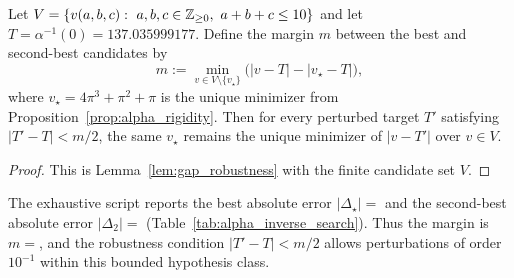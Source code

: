 \begin{corollary}
\label{cor:alpha_gap_robustness}
Let $V=\{v(a,b,c):\ a,b,c\in\mathbb{Z}_{\ge 0},\ a+b+c\le 10\}$ and let $T=\alpha^{-1}(0)=137.035999177$.
Define the margin $m$ between the best and second-best candidates by
\[
m := \min_{v\in V\setminus\{v_\star\}} \big(|v-T|-|v_\star-T|\big),
\]
where $v_\star=4\pi^3+\pi^2+\pi$ is the unique minimizer from Proposition~\ref{prop:alpha_rigidity}.
Then for every perturbed target $T'$ satisfying $|T'-T|<m/2$, the same $v_\star$ remains the unique minimizer of $|v-T'|$ over $v\in V$.
\end{corollary}

\begin{proof}
This is Lemma~\ref{lem:gap_robustness} with the finite candidate set $V$.
\end{proof}

\begin{remark}
The exhaustive script reports the best absolute error $|\Delta_\star|=$ and the second-best absolute error $|\Delta_2|=$ (Table~\ref{tab:alpha_inverse_search}).
Thus the margin is $m=$, and the robustness condition $|T'-T|<m/2$ allows perturbations of order $10^{-1}$ within this bounded hypothesis class.
\end{remark}


